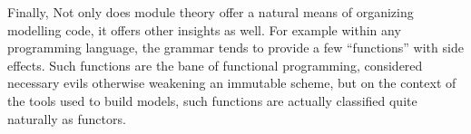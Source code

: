 \documentclass[twoside]{article}
\begin{document}
Finally, Not only does module theory offer a natural means of organizing modelling code, it offers other insights as well.
For example within any programming language, the grammar tends to provide a few ``functions'' with side effects. Such
functions are the bane of functional programming, considered necessary evils otherwise weakening an immutable scheme,
but on the context of the tools used to build models, such functions are actually classified quite naturally as functors. 
\end{document}
